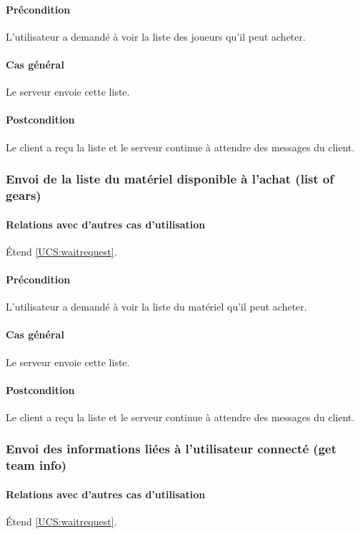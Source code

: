 	\paragraph{Précondition} L'utilisateur a demandé à voir la liste des joueurs qu'il peut acheter.
    \paragraph{Cas général} Le \gls{serveur} envoie cette liste.
    \paragraph{Postcondition} Le \gls{client} a reçu la liste et le serveur continue à attendre des messages du client.
    
\subsubsection{Envoi de la liste du matériel disponible à l'achat (list of gears)}
	\label{UCS:sendgear}
	\paragraph{Relations avec d'autres cas d'utilisation} \'Etend \ref{UCS:waitrequest}.
	\paragraph{Précondition} L'utilisateur a demandé à voir la liste du matériel qu'il peut acheter.
    \paragraph{Cas général} Le \gls{serveur} envoie cette liste.
    \paragraph{Postcondition} Le \gls{client} a reçu la liste et le serveur continue à attendre des messages du client.
    
\subsubsection{Envoi des informations liées à l'utilisateur connecté (get team info)}
	\label{UCS:sendinfo}
	\paragraph{Relations avec d'autres cas d'utilisation} \'Etend \ref{UCS:waitrequest}.
